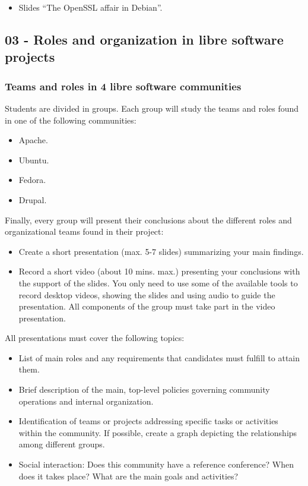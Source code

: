 \documentclass[a4paper]{article}
\begin{document}
\begin{itemize}
\item Slides ``The OpenSSL affair in Debian''.
\end{itemize}

\subsection{03 - Roles and organization in libre software projects}


\subsubsection{Teams and roles in 4 libre software communities}
\label{sub:roles-communities}

Students are divided in groups. Each group will study the teams and roles found 
in one of the following communities:

\begin{itemize}
 \item Apache.
 \item Ubuntu.
 \item Fedora.
 \item Drupal.
\end{itemize}
 

Finally, every group will present their conclusions about the different roles 
and organizational teams found in their project:

\begin{itemize}
 \item Create a short presentation (max. 5-7 slides) summarizing your main 
    findings.
 \item Record a short video (about 10 mins. max.) presenting your conclusions 
with the support of the slides. You only need to use some of the available 
tools to record desktop videos, showing the slides and using audio to guide the 
presentation. All components of the group must take part in the video
presentation.

\end{itemize}

All presentations must cover the following topics:

\begin{itemize}
 \item List of main roles and any requirements that candidates must fulfill to 
attain them.
 \item Brief description of the main, top-level policies governing community 
operations and internal organization.
 \item Identification of teams or projects addressing specific tasks or 
activities within the community. If possible, create a graph depicting
the relationships among different groups.
 \item Social interaction: Does this community have a reference conference? 
When does it takes place? What are the main goals and activities?
\end{itemize}
\end{document}

